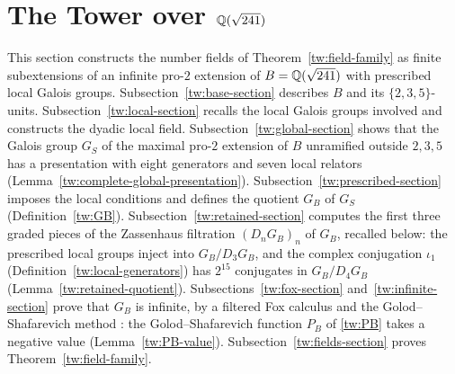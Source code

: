 \section{\texorpdfstring{The Tower over $\mathbb Q(\sqrt{241})$}{The Tower over Q(sqrt 241)}}\label{tw:tower}

This section constructs the number fields of Theorem~\ref{tw:field-family}
as finite subextensions of an infinite pro-$2$ extension of $B=\mathbb Q(\sqrt{241})$
with prescribed local Galois groups. Subsection~\ref{tw:base-section} describes $B$ and its
$\{2,3,5\}$-units. Subsection~\ref{tw:local-section} recalls the local Galois
groups involved and constructs the dyadic local field.
Subsection~\ref{tw:global-section} shows that the Galois group
$G_S$ of the maximal pro-$2$ extension of $B$ unramified outside
$2,3,5$ has a presentation with eight generators and seven local relators
(Lemma~\ref{tw:complete-global-presentation}).
Subsection~\ref{tw:prescribed-section} imposes the local conditions and
defines the quotient $G_B$ of $G_S$ (Definition~\ref{tw:GB}).
Subsection~\ref{tw:retained-section} computes the first three graded pieces
of the Zassenhaus filtration $(D_nG_B)_n$ of $G_B$, recalled below: the
prescribed local groups inject into $G_B/D_3G_B$, and the complex
conjugation $\iota_1$ (Definition~\ref{tw:local-generators}) has $2^{15}$
conjugates in $G_B/D_4G_B$ (Lemma~\ref{tw:retained-quotient}).
Subsections~\ref{tw:fox-section} and~\ref{tw:infinite-section} prove that
$G_B$ is infinite, by a filtered Fox calculus and the Golod--Shafarevich
method \cite{GolodShafarevich}: the Golod--Shafarevich function $P_B$ of
\eqref{tw:PB} takes a negative value (Lemma~\ref{tw:PB-value}).
Subsection~\ref{tw:fields-section} proves Theorem~\ref{tw:field-family}.

